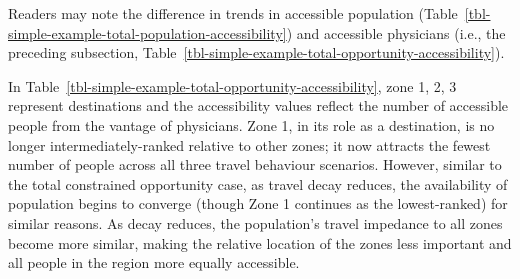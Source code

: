 \documentclass[
  10pt,
  letterpaper,
]{article}
\begin{document}
\begin{table}

\caption{\label{tbl-simple-example-total-population-accessibility}Simple
system: total constrained accessible population.}


\end{table}%

Readers may note the difference in trends in accessible population
(Table~\ref{tbl-simple-example-total-population-accessibility}) and
accessible physicians (i.e., the preceding subsection,
Table~\ref{tbl-simple-example-total-opportunity-accessibility}).

In Table~\ref{tbl-simple-example-total-opportunity-accessibility}, zone
1, 2, 3 represent destinations and the accessibility values reflect the
number of accessible people from the vantage of physicians. Zone 1, in
its role as a destination, is no longer intermediately-ranked relative
to other zones; it now attracts the fewest number of people across all
three travel behaviour scenarios. However, similar to the total
constrained opportunity case, as travel decay reduces, the availability
of population begins to converge (though Zone 1 continues as the
lowest-ranked) for similar reasons. As decay reduces, the population's
travel impedance to all zones become more similar, making the relative
location of the zones less important and all people in the region more
equally accessible.
\end{document}
